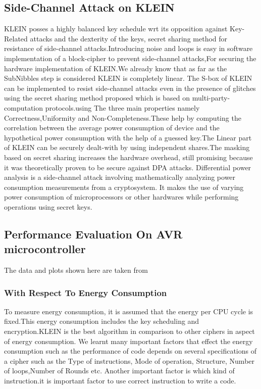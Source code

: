 \documentclass[preprint]{transcrypto}
\begin{document}
\subsection{Side-Channel Attack on KLEIN}
KLEIN posses a highly balanced key schedule wrt its opposition against Key-Related attacks and the dexterity of the keys, secret sharing method for resistance of side-channel attacks.Introducing noise and loops is easy in software implementation of a block-cipher to prevent side-channel attacks,For securing the hardware implementation of KLEIN.We already know that as far as the SubNibbles step is considered KLEIN is completely linear. The S-box of KLEIN can be implemented to resist side-channel attacks even in the presence of glitches using the secret sharing method proposed which is based on multi-party-computation protocols.using The three main properties namely Correctness,Uniformity and Non-Completeness.These help by computing the correlation between the average power consumption of device and the hypothetical power consumption with the help of a guessed key.The Linear part of KLEIN can be securely dealt-with by using independent shares.The masking based on secret sharing increases the hardware overhead, still promising because it was theoretically proven to be secure against DPA attacks. Differential power analysis is a side-channel attack involving mathematically analyzing power consumption measurements from a cryptosystem. It makes the use of  varying power consumption of microprocessors or other hardwares while performing operations using secret keys.\\

\subsection{Performance Evaluation On AVR microcontroller}

The data and plots shown here are taken from 

\subsubsection{With Respect To Energy Consumption}
To measure energy consumption, it is assumed that
the energy per CPU cycle is fixed.This energy consumption
includes the key scheduling and encryption.KLEIN is the best algorithm in comparison to other ciphers in aspect of energy consumption. We learnt many important factors that effect the energy consumption such as the performance of code depends on several specifications of a cipher such as
the Type of instructions, Mode of operation, Structure, Number of loops,Number of Rounds etc. Another important factor is which kind of instruction.it is important factor to use correct instruction
to write a code.\\
\end{document}
